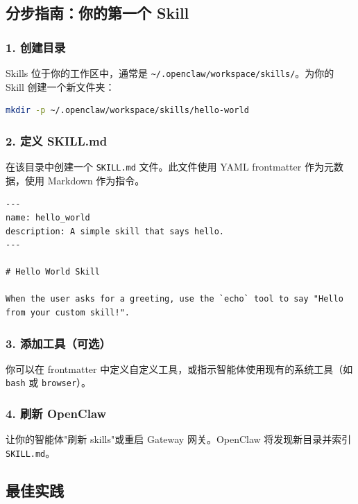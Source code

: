 \subsection{分步指南：你的第一个 Skill}


\subsubsection{1. 创建目录}


Skills 位于你的工作区中，通常是 \texttt{\textasciitilde{}/.openclaw/workspace/skills/}。为你的 Skill 创建一个新文件夹：

\begin{lstlisting}[language=bash]
mkdir -p ~/.openclaw/workspace/skills/hello-world
\end{lstlisting}


\subsubsection{2. 定义 SKILL.md}


在该目录中创建一个 \texttt{SKILL.md} 文件。此文件使用 YAML frontmatter 作为元数据，使用 Markdown 作为指令。

\begin{lstlisting}
---
name: hello_world
description: A simple skill that says hello.
---

# Hello World Skill

When the user asks for a greeting, use the `echo` tool to say "Hello from your custom skill!".
\end{lstlisting}


\subsubsection{3. 添加工具（可选）}


你可以在 frontmatter 中定义自定义工具，或指示智能体使用现有的系统工具（如 \texttt{bash} 或 \texttt{browser}）。

\subsubsection{4. 刷新 OpenClaw}


让你的智能体"刷新 skills"或重启 Gateway 网关。OpenClaw 将发现新目录并索引 \texttt{SKILL.md}。

\subsection{最佳实践}


